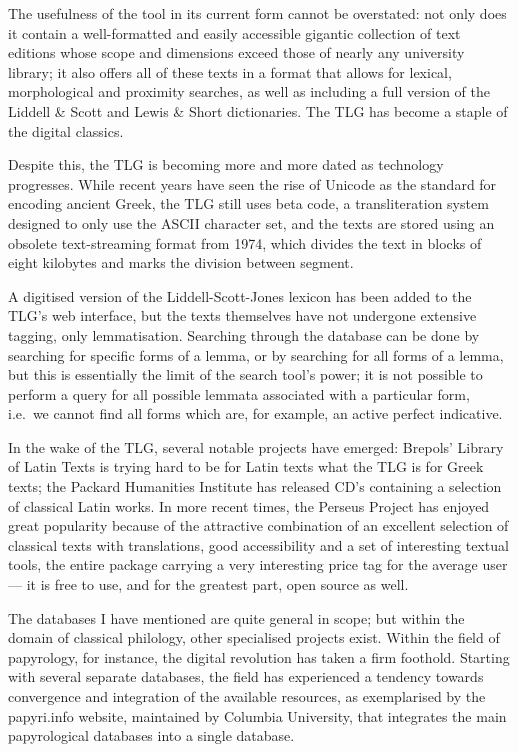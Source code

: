 \documentclass[10pt,a4paper,twoside,openright,titlepage,fleqn,%
               headinclude,,footinclude,BCOR5mm,%
               numbers=noenddot,cleardoublepage=empty,%
               tablecaptionabove]{scrbook}
\begin{document}
The usefulness of the tool in its current form cannot be overstated: not only
does it contain a well-formatted and easily accessible gigantic collection of
text editions whose scope and dimensions exceed those of nearly any university
library; it also offers all of these texts in a format that allows for lexical,
morphological and proximity searches, as well as including a full version of
the Liddell \& Scott and Lewis \& Short dictionaries. The TLG has become a
staple of the digital classics.

Despite this, the TLG is becoming more and more dated as technology progresses.
While recent years have seen the rise of Unicode as the standard for encoding
ancient Greek, the TLG still uses beta code, a transliteration system designed
to only use the ASCII character set, and the texts are stored using an obsolete
text-streaming format from 1974, which divides the text in blocks of eight
kilobytes and marks the division between segment. 

A digitised version of the Liddell-Scott-Jones lexicon has been added to the
TLG's web interface, but the texts themselves have not undergone extensive
tagging, only lemmatisation.  Searching through the database can be done by
searching for specific forms of a lemma, or by searching for all forms of a
lemma, but this is essentially the limit of the search tool's power; it is not
possible to perform a query for all possible lemmata associated with a
particular form, i.e.\ we cannot find all forms which are, for example, an
active perfect indicative.

In the wake of the TLG, several notable projects have emerged: Brepols' Library
of Latin Texts is trying hard to be for Latin texts what the TLG is for Greek
texts; the Packard Humanities Institute has released CD's containing a
selection of classical Latin works. In more recent times, the Perseus Project
has enjoyed great popularity because of the attractive combination of an
excellent selection of classical texts with translations, good accessibility
and a set of interesting textual tools, the entire package carrying a very
interesting price tag for the average user — it is free to use, and for the
greatest part, open source as well.

The databases I have mentioned are quite general in scope; but within the
domain of classical philology, other specialised projects exist. Within the
field of papyrology, for instance, the digital revolution has taken a firm
foothold. Starting with several separate databases, the field has experienced a
tendency towards convergence and integration of the available resources, as
exemplarised by the papyri.info website, maintained by Columbia University,
that integrates the main papyrological databases into a single database.
\end{document}
